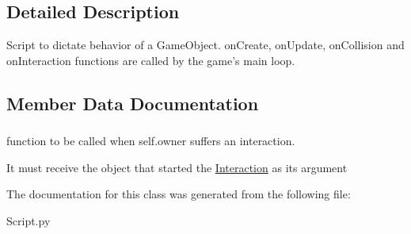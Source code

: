 \subsection{\-Detailed \-Description}
\begin{DoxyVerb}Script to dictate behavior of a GameObject. onCreate, onUpdate, onCollision
and onInteraction functions are called by the game's main loop.
\end{DoxyVerb}
 

\subsection{\-Member \-Data \-Documentation}
\hypertarget{classScript_1_1Script_a2005d9e06798af0c2c8e6fa2ca976fb6}{
\subsubsection[{on\-Interaction}]{}}\label{classScript_1_1Script_a2005d9e06798af0c2c8e6fa2ca976fb6}


function to be called when self.\-owner suffers an interaction. 

\-It must receive the object that started the \hyperlink{namespaceInteraction}{\-Interaction} as its argument 

\-The documentation for this class was generated from the following file\-:\begin{DoxyCompactItemize}
\item 
\-Script.\-py\end{DoxyCompactItemize}
